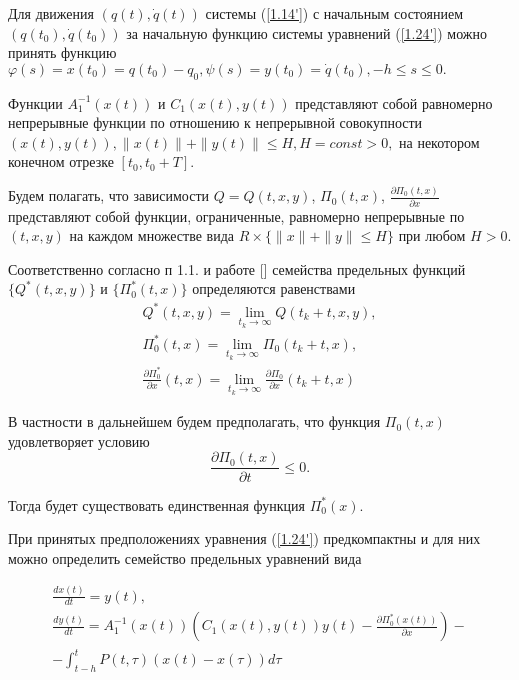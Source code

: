 Для движения $(q(t), \dot q(t))$ системы (\ref{1.14'}) с начальным состоянием $(q(t_0), \dot q(t_0))$ за начальную функцию системы уравнений (\ref{1.24'}) можно принять функцию $\varphi (s) = x(t_0) = q(t_0) - q_0, \psi (s) = y(t_0) = \dot q (t_0), -h \le s \le 0.$

Функции $A_1^{-1} (x(t))$ и $C_1(x(t), y(t))$ представляют собой равномерно непрерывные функции по отношению к непрерывной совокупности $(x(t), y(t)), \| x(t) \| + \| y(t) \| \le H, H = const > 0,$ на некотором конечном отрезке $[t_0, t_0 + T].$

Будем полагать, что зависимости $Q = Q(t, x, y)$, $\Pi_0 (t, x)$, $\frac{\partial \Pi_0 (t, x)}{\partial x}$ представляют собой функции, ограниченные, равномерно непрерывные по $(t, x, y)$ на каждом множестве вида $R \times \lbrace \| x \| + \| y \| \le H \rbrace$ при любом $H > 0.$

Соответственно согласно п 1.1. и работе [] семейства предельных функций $\lbrace Q^{*} (t, x, y) \rbrace$ и $\lbrace \Pi_0^{*} (t, x) \rbrace$ определяются равенствами 
$$\begin{array}{c}
	\displaystyle Q^{*} (t, x, y) = \lim_{t_k \to \infty} Q(t_k + t, x, y),\\
	\displaystyle \Pi_0^{*} (t, x) = \lim_{t_k \to \infty} \Pi_0 (t_k + t, x),\\ 
	\displaystyle \frac{\partial \Pi_0^{*}}{\partial x} (t, x) = \lim_{t_k \to \infty} \frac{\partial \Pi_0}{\partial x} (t_k + t, x)
\end{array}$$

В частности в дальнейшем будем предполагать, что функция $\Pi_0 (t, x)$ удовлетворяет условию
\begin{equation} \label{1.25_1'}
\frac{\partial \Pi_0 (t, x)}{\partial t} \le 0.
\end{equation}

Тогда будет существовать единственная функция $\Pi_0^{*} (x)$.

При принятых предположениях уравнения (\ref{1.24'}) предкомпактны и для них можно определить семейство предельных уравнений вида 

\begin{equation} \label{1.25'}
	\begin{array}{c}
		\frac{d x(t)}{d t} = y(t),\\
		\frac{d y(t)}{d t} = A_1^{-1} (x(t)) (C_1 (x(t), y(t)) y(t) - \frac{\partial \Pi_0^{*} (x(t))}{\partial x}) -\\- \displaystyle \int_{t- h}^{t} P(t, \tau) (x(t) - x(\tau)) d \tau
	\end{array}
\end{equation}

